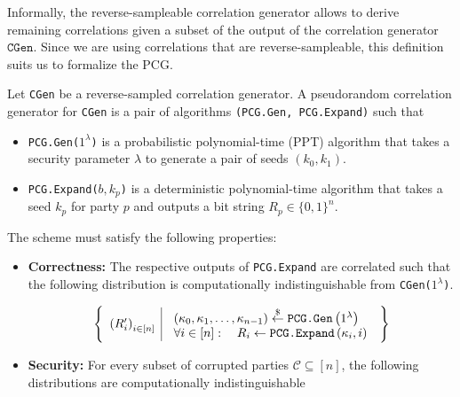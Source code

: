 Informally, the reverse-sampleable correlation generator allows to derive remaining correlations given a subset of the output of the correlation generator $\texttt{CGen}$. Since we are using correlations that are reverse-sampleable, this definition suits us to formalize the PCG.

\begin{definition}
\label{def:PCGprelim}
Let \texttt{\textup{CGen}} be a reverse-sampled correlation generator. A pseudorandom correlation generator for \texttt{\textup{CGen}} is a pair of algorithms \texttt{\textup{(PCG.Gen, PCG.Expand)}} such that
    \begin{itemize}
        \item \texttt{\textup{PCG.Gen($1^\lambda$)}} is a probabilistic polynomial-time (PPT) algorithm that takes a security parameter $\lambda$ to generate a pair of seeds $(k_0, k_1)$.
        \item \texttt{\textup{PCG.Expand($b, k_p$)}} is a deterministic polynomial-time algorithm that takes a seed $k_p$ for party $p$ and outputs a bit string $R_p \in \{0,1\}^n$.
    \end{itemize}
    
    The scheme must satisfy the following properties:
    \begin{itemize}
        \item \textbf{\textup{\textbf{Correctness:}}} The respective outputs of  \texttt{\textup{PCG.Expand}} are correlated such that the following distribution is computationally indistinguishable from \texttt{\textup{CGen($1^\lambda$)}}.
        
        $$
        \left\{\begin{array}{l|l}
        \left(R_i^{\prime}\right)_{i \in[n]} & \begin{array}{l}
        \left(\kappa_0, \kappa_1, \ldots, \kappa_{n-1}\right) \stackrel{\$}{\leftarrow} \texttt{\textup{PCG.Gen}}\left(1^\lambda\right) \\
        \forall i \in[n]: \quad R_i \leftarrow \texttt{\textup{PCG.Expand}}\left(\kappa_i, i\right)
        \end{array}
        \end{array}\right\}
        $$
        
        \item \textbf{\textup{\textbf{Security:}}} For every subset of corrupted parties $\mathcal{C} \subseteq [n]$, the following distributions are computationally indistinguishable


\end{itemize}
\end{definition}
